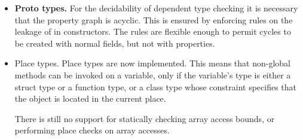 \begin{itemize}
\item{\bf Proto types.} For the decidability of dependent type
  checking it is necessary that the property graph is acyclic. This is
  ensured by enforcing rules on the leakage of  in
  constructors. The rules are flexible enough to permit cycles to be
  created with normal fields, but not with properties.

\item{Place types.} Place types are now implemented. This means that
  non-global methods can be invoked on a variable, only if the
  variable's type is either a struct type or a function type, or a
  class type whose constraint specifies that the object is located in
  the current place.

  There is still no support for statically checking array access
  bounds, or performing place checks on array accesses.

\end{itemize}
